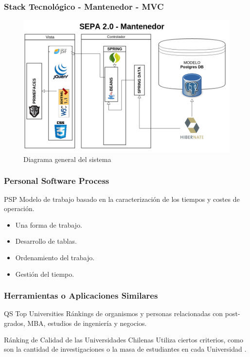 \documentclass{beamer}
\begin{document}
\begin{frame}
\frametitle{Stack Tecnológico - Mantenedor - MVC}
\begin{figure}[!hbp]
\begin{center}
\includegraphics[scale=0.25,angle=0]{images/sepa_mvc.png}
\caption{Diagrama general del sistema}
\label{Diagrama general del sistema}
\end{center}
\end{figure}
\end{frame}


\begin{frame}
\frametitle{Personal Software Process}
\begin{block}{PSP}
Modelo de trabajo basado en la caracterización de los tiempos y costes de operación.
\end{block}

\begin{itemize}
\item Una forma de trabajo.
\item Desarrollo de tablas.
\item Ordenamiento del trabajo.
\item Gestión del tiempo.
\end{itemize}
\end{frame}


\begin{frame}
\frametitle{Herramientas o Aplicaciones Similares}
\begin{block}{QS Top Universities}
Ránkings de organismos y personas relacionadas con post-grados, MBA, estudios de ingeniería y negocios.
\end{block}
\begin{block}{Ránking de Calidad de las Universidades Chilenas}
Utiliza ciertos criterios, como son la cantidad de investigaciones o la masa de estudiantes en cada Universidad \cite{p1}.
\end{block}
\end{frame}
\end{document}
